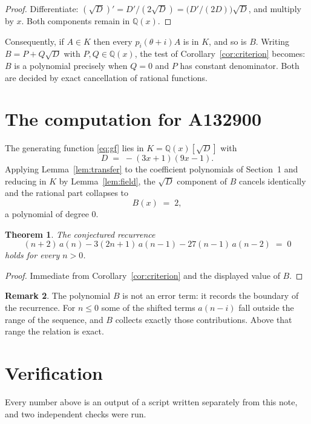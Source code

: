 \documentclass[11pt,a4paper]{article}
\theoremstyle{plain}
\newtheorem{theorem}{Theorem}
\theoremstyle{definition}
\newtheorem{remark}[theorem]{Remark}
\begin{document}
\begin{proof}
Differentiate: $(\sqrt{D})'=D'/(2\sqrt{D})=\bigl(D'/(2D)\bigr)\sqrt{D}$, and multiply by
$x$. Both components remain in $\mathbb{Q}(x)$.
\end{proof}

Consequently, if $A\in K$ then every $p_{i}(\theta+i)A$ is in $K$, and so is $B$. Writing
$B=P+Q\sqrt{D}$ with $P,Q\in\mathbb{Q}(x)$, the test of Corollary~\ref{cor:criterion}
becomes: $B$ is a polynomial precisely when $Q=0$ and $P$ has constant denominator. Both
are decided by exact cancellation of rational functions.

\section{The computation for A132900}

The generating function \eqref{eq:gf} lies in $K=\mathbb{Q}(x)[\sqrt{D}]$ with
\[
D \;=\; - \left(3 x + 1\right) \left(9 x - 1\right) .
\]
Applying Lemma~\ref{lem:transfer} to the coefficient polynomials of Section~1 and reducing
in $K$ by Lemma~\ref{lem:field}, the $\sqrt{D}$ component of $B$ cancels identically and
the rational part collapses to
\[
B(x)\;=\;2 ,
\]
a polynomial of degree $0$.

\begin{theorem}
The conjectured recurrence
\[
(n + 2)\,a(n) -  3 \left(2 n + 1\right)\,a(n-1) -  27 \left(n - 1\right)\,a(n-2) \;=\;0
\]
holds for every $n>0$.
\end{theorem}

\begin{proof}
Immediate from Corollary~\ref{cor:criterion} and the displayed value of $B$.
\end{proof}

\begin{remark}
The polynomial $B$ is not an error term: it records the boundary of the recurrence. For
$n\le0$ some of the shifted terms $a(n-i)$ fall outside the range of the sequence,
and $B$ collects exactly those contributions. Above that range the relation is exact.
\end{remark}

\section{Verification}

Every number above is an output of a script written separately from this note, and two
independent checks were run.
\end{document}
